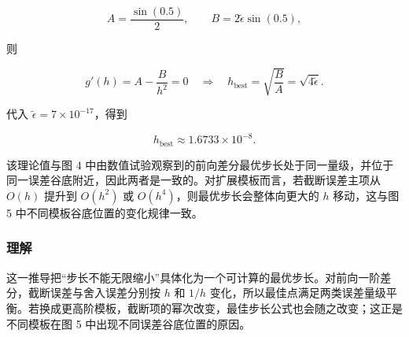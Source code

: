 \documentclass[12pt,a4paper,fontset=none]{ctexart}
\newcommand{\blocktitle}[1]{\subsubsection{#1}}
\begin{document}
\[
A=\frac{\sin(0.5)}{2},\qquad
B=2\tilde{\epsilon}\sin(0.5),
\]

则

\[
g'(h)=A-\frac{B}{h^2}=0
\quad\Longrightarrow\quad
h_{\text{best}}=\sqrt{\frac{B}{A}}=\sqrt{4\tilde{\epsilon}}.
\]

代入 \(\tilde{\epsilon}=7\times 10^{-17}\)，得到

\[
h_{\text{best}}\approx 1.6733\times 10^{-8}.
\]

该理论值与图 4 中由数值试验观察到的前向差分最优步长处于同一量级，并位于同一误差谷底附近，因此两者是一致的。对扩展模板而言，若截断误差主项从 \(O(h)\) 提升到 \(O(h^2)\) 或 \(O(h^4)\)，则最优步长会整体向更大的 \(h\) 移动，这与图 5 中不同模板谷底位置的变化规律一致。

\blocktitle{理解}

这一推导把“步长不能无限缩小”具体化为一个可计算的最优步长。对前向一阶差分，截断误差与舍入误差分别按 \(h\) 和 \(1/h\) 变化，所以最佳点满足两类误差量级平衡。若换成更高阶模板，截断项的幂次改变，最佳步长公式也会随之改变；这正是不同模板在图 5 中出现不同误差谷底位置的原因。
\end{document}
